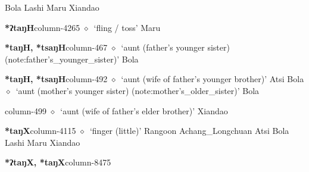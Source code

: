          Bola 
\hspace{1ex}
         Lashi 
\hspace{1ex}
         Maru 
\hspace{1ex}
         Xiandao 
  \item {\footnotesize \textbf{*ʔtaŋH}}{\tiny column-4265}
         $\diamond$~`fling / toss'
         Maru 
  \item {\footnotesize \textbf{*taŋH, *tsaŋH}}{\tiny column-467}
         $\diamond$~`aunt (father's younger sister) (note:father's_younger_sister)'
         Bola 
  \item {\footnotesize \textbf{*taŋH, *tsaŋH}}{\tiny column-492}
         $\diamond$~`aunt (wife of father's younger brother)'
         Atsi 
\hspace{1ex}
         Bola 
\hspace{1ex}
         $\diamond$~`aunt (mother's younger sister) (note:mother's_older_sister)'
         Bola 
  \item {\footnotesize \textbf{}}{\tiny column-499}
         $\diamond$~`aunt (wife of father's elder brother)'
         Xiandao 
  \item {\footnotesize \textbf{*taŋX}}{\tiny column-4115}
         $\diamond$~`finger (little)'
         Rangoon 
\hspace{1ex}
         Achang\_Longchuan 
\hspace{1ex}
         Atsi 
\hspace{1ex}
         Bola 
\hspace{1ex}
         Lashi 
\hspace{1ex}
         Maru 
\hspace{1ex}
         Xiandao 
  \item {\footnotesize \textbf{*ʔtaŋX, *taŋX}}{\tiny column-8475}
